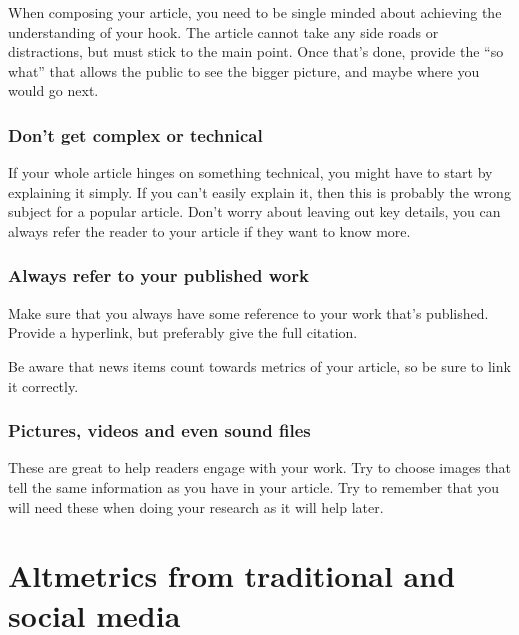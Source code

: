 \documentclass[
]{krantz}
\begin{document}
When composing your article, you need to be single minded about achieving the understanding of your hook. The article cannot take any side roads or distractions, but must stick to the main point. Once that's done, provide the ``so what'' that allows the public to see the bigger picture, and maybe where you would go next.

\hypertarget{dont-get-complex-or-technical}{%
\subsection{Don't get complex or technical}\label{dont-get-complex-or-technical}}

If your whole article hinges on something technical, you might have to start by explaining it simply. If you can't easily explain it, then this is probably the wrong subject for a popular article. Don't worry about leaving out key details, you can always refer the reader to your article if they want to know more.

\hypertarget{always-refer-to-your-published-work}{%
\subsection{Always refer to your published work}\label{always-refer-to-your-published-work}}

Make sure that you always have some reference to your work that's published. Provide a hyperlink, but preferably give the full citation.

Be aware that news items count towards metrics of your article, so be sure to link it correctly.

\hypertarget{pictures-videos-and-even-sound-files}{%
\subsection{Pictures, videos and even sound files}\label{pictures-videos-and-even-sound-files}}

These are great to help readers engage with your work. Try to choose images that tell the same information as you have in your article. Try to remember that you will need these when doing your research as it will help later.

\hypertarget{altmetrics}{%
\chapter{Altmetrics from traditional and social media}\label{altmetrics}}
\end{document}
